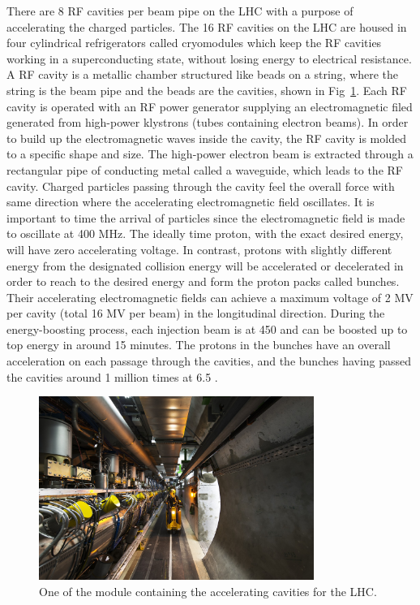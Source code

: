 There are 8 RF cavities per beam pipe on the LHC with a purpose of accelerating the charged particles.
The 16 RF cavities on the LHC are housed in four cylindrical refrigerators called cryomodules which keep the RF cavities working in a superconducting state, without losing energy to electrical resistance.
A RF cavity is a metallic chamber structured like beads on a string, where the string is the beam pipe and the beads are the cavities, shown in Fig~\ref{fig:rf_cavities}.
Each RF cavity is operated with an RF power generator supplying an electromagnetic filed generated from high-power klystrons (tubes containing electron beams).
In order to build up the electromagnetic waves inside the cavity, the RF cavity is molded to a specific shape and size.
The high-power electron beam is extracted through a rectangular pipe of conducting metal called a waveguide, which leads to the RF cavity.
Charged particles passing through the cavity feel the overall force with same direction where the accelerating electromagnetic field oscillates.
It is important to time the arrival of particles since the electromagnetic field is made to oscillate at 400 MHz.
The ideally time proton, with the exact desired energy, will have zero accelerating voltage.
In contrast, protons with slightly different energy from the designated collision energy will be accelerated or decelerated in order to reach to the desired energy and form the proton packs called bunches.
Their accelerating electromagnetic fields can achieve a maximum voltage of 2 MV per cavity (total 16 MV per beam) in the longitudinal direction.
During the energy-boosting process, each injection beam is at 450 \GeV and can be boosted up to top energy in around 15 minutes.
The protons in the bunches have an overall acceleration on each passage through the cavities, and the bunches having passed the cavities around 1 million times at 6.5 \GeV.
\begin{figure}\centering
    \includegraphics[width=0.8\textwidth]{figure/rf_cavities.jpg}
    \caption{One of the module containing the accelerating cavities for the LHC.}
    \label{fig:rf_cavities}
\end{figure}

